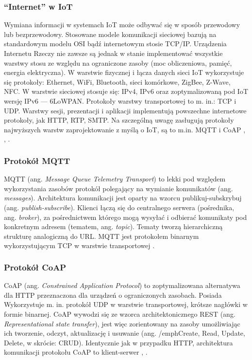 \documentclass[a4paper, 12pt, twoside]{article}
\begin{document}
\subsubsection{``Internet'' w IoT}

Wymiana informacji w systemach IoT może odbywać się w sposób przewodowy lub bezprzewodowy.
Stosowane modele komunikacji sieciowej bazują na standardowym modelu OSI bądź
internetowym stosie TCP/IP. Urządzenia Internetu Rzeczy nie zawsze są jednak 
w stanie implementować wszystkie warstwy stosu ze względu na ograniczone zasoby 
(moc obliczeniowa, pamięć, energia elektryczna). W warstwie fizycznej i łącza danych
sieci IoT wykorzystuje się protokoły: Ethernet, WiFi, Bluetooth, sieci komórkowe,
ZigBee, Z-Wave, NFC. W warstwie sieciowej stosuje się: IPv4, IPv6 oraz zoptymalizowaną
pod IoT wersję IPv6 --- 6LoWPAN. Protokoły warstwy transportowej to m. in.: TCP i UDP. 
Warstwy sesji, prezentacji i aplikacji implementują powszechne internetowe protokoły, jak
HTTP, RTP, SMTP. Na szczególną uwagę zasługują protokoły najwyższych warstw zaprojektowanie
z myślą o IoT, są to m.in. MQTT i CoAP \cite{internet-reczy}, \cite{intro-to-iot}, \cite{iot-hype-to-reality}.

\subsubsection*{Protokół MQTT}

MQTT (ang. \emph{Message Queue Telemetry Transport}) to lekki pod względem wykorzystania zasobów
protokół polegający na wymianie komunikatów (ang. \emph{messages}). Architektura komunikacji
jest oparty na wzorcu publikuj-subskrybuj (ang. \emph{publish-subscribe}).
Klienci łączą się do centralnego serwera (pośrednika, ang. \emph{broker}), za pośrednictwem
którego mogą wysyłać i odbierać komunikaty pod konkretnym adresem (tematem, ang. \emph{topic}).
Tematy tworzą hierarchiczną strukturę analogiczną do URL. MQTT jest protokołem binarnym
wykorzystującym TCP w warstwie transportowej \cite{iot-hype-to-reality}.

\subsubsection*{Protokół CoAP}

CoAP (ang. \emph{Constrained Application Protocol}) to zoptymalizowana alternatywa dla HTTP
przeznaczona dla urządzeń o ograniczonych zasobach. Posiada Wykorzystuje m. in. protokół
UDP w warstwie transportowej, krótsze nagłówki w formie binarnej. 
CoAP wywodzi się ze wzorca architektonicznego REST (ang. \emph{Representational state transfer}), 
jest więc zorientowany na zasoby umożliwiając ich tworzenie, odczyt, aktualizację
i usuwanie (ang. /emph{Create, Read, Update, Delete}, w skrócie: CRUD). 
Identycznie jak w przypadku HTTP, architektura komunikacji protokołu CoAP to klient-serwer 
\cite{intro-to-iot}, \cite{iot-hype-to-reality}.
\end{document}
